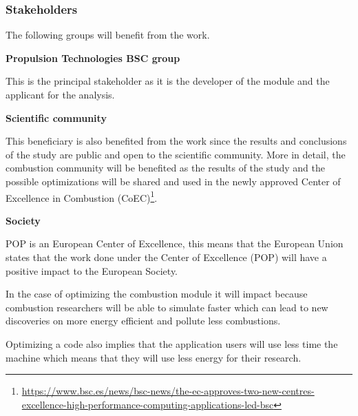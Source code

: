 \subsubsection{Stakeholders}


The following groups will benefit from the work.

\textbf{Propulsion Technologies BSC group}

This is the principal stakeholder as it is the developer of the module and the applicant for the analysis.

\textbf{Scientific community}

This beneficiary is also benefited from the work since the results and conclusions of the study are public and open to the scientific community. More in detail, the combustion community will be benefited as the results of the study and the possible optimizations will be shared and used in the newly approved Center of Excellence in Combustion (CoEC)\footnote{\url{https://www.bsc.es/news/bsc-news/the-ec-approves-two-new-centres-excellence-high-performance-computing-applications-led-bsc}}. 

\textbf{Society}

POP is an European Center of Excellence, this means that the European Union states that the work done under the Center of Excellence (POP) will have a positive impact to the European Society.

In the case of optimizing the combustion module it will impact because combustion researchers will be able to simulate faster which can lead to new discoveries on more energy efficient and pollute less combustions.

Optimizing a code also implies that the application users will use less time the machine which means that they will use less energy for their research.
